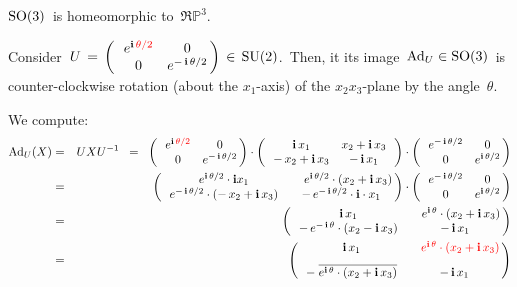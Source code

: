 
\vskip 0.5cm
\noindent
\begin{corollary}
\mbox{}
\vskip 0.05cm
\noindent
$\textnormal{SO}(3)$\, is homeomorphic to \,$\Re\mathbb{P}^{3}$.\,
\end{corollary}


\vskip 0.5cm
\begin{remark}
\mbox{}
\vskip 0.1cm
\noindent
Consider
\,$U \, = \, \left(\,\begin{array}{cc} e^{\textnormal{\bf i}\,{\color{red}\theta/2}} & 0 \\ 0 & e^{-\,\textnormal{\bf i}\,\theta/2} \end{array}\!\!\right) \,\in\, \textnormal{SU}(2)$.\,
Then, it its image
\,$\textnormal{Ad}_{U} \in \textnormal{SO}(3)$\,
is counter-clockwise rotation (about the $x_{1}$-axis) of the $x_{2}x_{3}$-plane by the angle \,{\color{red}$\theta$}.\,
\end{remark}
\proof
We compute:
\begin{eqnarray*}
\textnormal{Ad}_{U}(X)
& = &
	UXU^{-1}
\;\; = \;\;
	\left(\,\begin{array}{cc}
		e^{\i\,{\color{red}\theta/2}} & 0
		\\
		0 & e^{-\,\i\,\theta/2}
		\end{array}\!\!\right)
	\cdot
	\left(\,\begin{array}{cc}
		\i\,x_{1} & x_{2} + \i\,x_{3}
		\\
		- \, x_{2} + \i\,x_{3} & -\,\i\,x_{1}
		\end{array}\,\right)
	\cdot
	\left(\,\begin{array}{cc}
		e^{-\,\i\,\theta/2} & 0
		\\
		0 & e^{\i\,\theta/2}
		\end{array}\!\!\right)
\\
& = &
	\left(\,\begin{array}{cc}
		e^{\i\,\theta/2} \cdot \i x_{1} & \quad\,e^{\i\,\theta/2} \cdot (x_{2} + \i\,x_{3})
		\\
		e^{-\,\i\,\theta/2} \cdot (-\,x_{2} + \i\,x_{3}) & -\,e^{-\,\i\,\theta/2} \cdot \i \cdot x_{1}
		\end{array}\!\!\right)
	\cdot
	\left(\,\begin{array}{cc}
		e^{-\,\i\,\theta/2} & 0
		\\
		0 & e^{\i\,\theta/2}
		\end{array}\!\!\right)
\\
& = &
	\left(\,\begin{array}{cc}
		\i \, x_{1} & \quad{\color{black}e^{\i\,\theta} \cdot (x_{2} + \i\,x_{3})}
		\\
		-\,e^{-\,\i\,\theta} \cdot (x_{2} - \i\,x_{3}) & -\, \i \, x_{1}
		\end{array}\!\!\right)
\\
& = &
	\left(\,\begin{array}{cc}
		\i \, x_{1} & \quad{\color{red}e^{\i\,\theta} \cdot (x_{2} + \i\,x_{3})}
		\\
		\overset{{\color{white}1}}{-\;\overline{e^{\i\,\theta} \cdot (x_{2} + \i\,x_{3})}} & -\, \i \, x_{1}
		\end{array}\!\!\right)
\end{eqnarray*}
